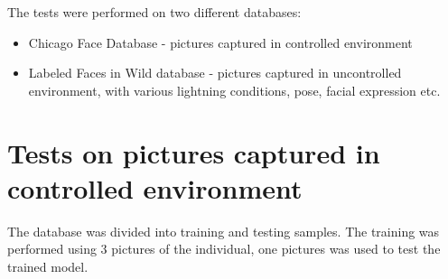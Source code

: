 The tests were performed on two different databases: 
\begin{itemize}
\itemsep0em 
\item Chicago Face Database - pictures captured in controlled environment
\item Labeled Faces in Wild database - pictures captured in uncontrolled environment, with various lightning conditions, pose, facial expression etc. 
\end{itemize}


\section{Tests on pictures captured in controlled environment}

The database was divided into training and testing samples. The training was performed using 3 pictures of the individual, one pictures was used to test the trained model. 

